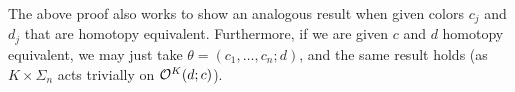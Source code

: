 \documentclass[a4paper,10pt
,draft
]{article}%
\renewcommand{\1}{\ensuremath{\mathbb{id}}}
\begin{document}
\begin{remark}
      \label{CAV_4.14_REM}
      The above proof also works to show an analogous result when given colors $c_j$ and $d_j$ that are homotopy equivalent.
      Furthermore, if we are given $c$ and $d$ homotopy equivalent, we may just take $\theta = (c_1,\dots, c_n;d)$,
      and the same result holds (as $K\times\Sigma_n$ acts trivially on $\mathcal{O}^K(d;c)$).
\end{remark}




\end{document}
